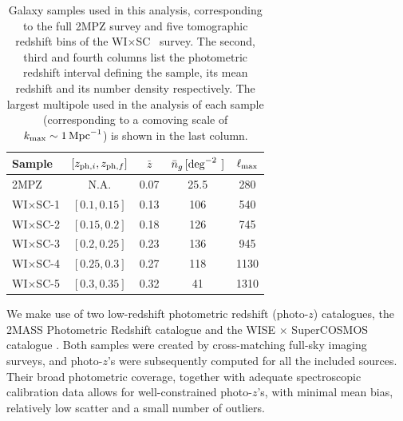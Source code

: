 \documentclass[useAMS,usenatbib]{mn2e}
\newcommand{\wisc}{WI$\times$SC}
\begin{document}
    \begin{table}
      \begin{center}
        \begin{tabular}{l|cccc}
          \hline
          Sample & $[z_{{\rm ph},i},z_{{\rm ph},f}]$ & $\bar{z}$ & $\bar{n}_g\,[{\rm deg}^{-2^{\phantom{2}}}]$ & $\ell_{\rm max}$\\[1ex]
          \hline
          2MPZ    & N.A.         & 0.07 &  25.5 &  280 \\
          \wisc-1 & $[0.1,0.15]$ & 0.13 & 106   &  540 \\
          \wisc-2 & $[0.15,0.2]$ & 0.18 & 126   &  745 \\
          \wisc-3 & $[0.2,0.25]$ & 0.23 & 136   &  945 \\
          \wisc-4 & $[0.25,0.3]$ & 0.27 & 118   & 1130 \\
          \wisc-5 & $[0.3,0.35]$ & 0.32 & 41    & 1310 \\
          \hline
        \end{tabular}
        \caption{Galaxy samples used in this analysis, corresponding to the full 2MPZ survey and five tomographic redshift bins of the \wisc~ survey. The second, third and fourth columns list the photometric redshift interval defining the sample, its mean redshift and its number density respectively. The largest multipole used in the analysis of each sample (corresponding to a comoving scale of $k_{\rm max}\sim 1\,{\rm Mpc}^{-1}$) is shown in the last column.}\label{tab:z_bins}
      \end{center}
    \end{table} 
    We make use of two low-redshift photometric redshift (photo-$z$) catalogues, the 2MASS Photometric Redshift catalogue \citep[2MPZ,][]{2014ApJS..210....9B} and the WISE $\times$ SuperCOSMOS catalogue \citep[\wisc,][]{2016ApJS..225....5B}. Both samples were created by cross-matching full-sky imaging surveys, and photo-$z$'s were subsequently computed for all the included sources. Their broad photometric coverage, together with adequate spectroscopic calibration data allows for well-constrained photo-$z$'s, with minimal mean bias, relatively low scatter and a small number of outliers.
    
\end{document}
